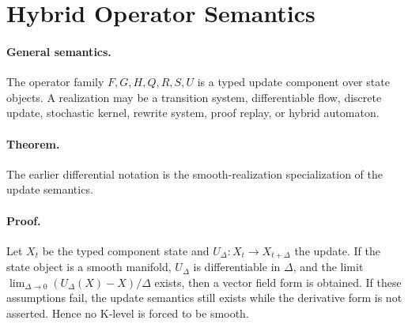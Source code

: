 
\section{Hybrid Operator Semantics}
\label{app:oc133-hybrid-operators}

\paragraph{General semantics.}
The operator family \(F,G,H,Q,R,S,U\) is a typed update component over state
objects.  A realization may be a transition system, differentiable flow,
discrete update, stochastic kernel, rewrite system, proof replay, or hybrid
automaton.

\paragraph{Theorem.}
The earlier differential notation is the smooth-realization
specialization of the update semantics.

\paragraph{Proof.}
Let \(X_t\) be the typed component state and \(U_\Delta:X_t\to X_{t+\Delta}\)
the update.  If the state object is a smooth manifold, \(U_\Delta\) is
differentiable in \(\Delta\), and the limit
\(\lim_{\Delta\to0}(U_\Delta(X)-X)/\Delta\) exists, then a vector field form is
obtained.  If these assumptions fail, the update semantics still exists while
the derivative form is not asserted.  Hence no K-level is forced to be smooth.
